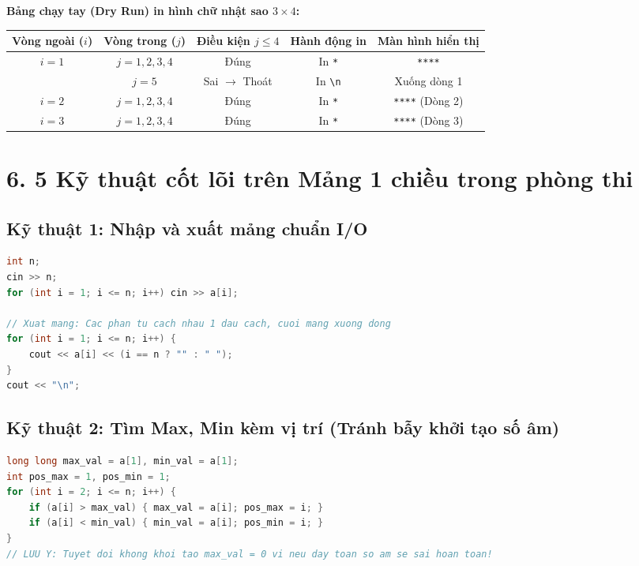 \documentclass[11pt,a4paper]{article}
\begin{document}
\vspace{-0.1cm}
\begin{center}
\footnotesize
\textbf{Bảng chạy tay (Dry Run) in hình chữ nhật sao $3 \times 4$:}
\vspace{0.1cm}

\begin{tabular}{ccccc}
\toprule
\textbf{Vòng ngoài ($i$)} & \textbf{Vòng trong ($j$)} & \textbf{Điều kiện $j \le 4$} & \textbf{Hành động in} & \textbf{Màn hình hiển thị} \\
\midrule
$i = 1$ & $j = 1, 2, 3, 4$ & Đúng & In \texttt{*} & \texttt{****} \\
        & $j = 5$          & Sai $\rightarrow$ Thoát & In \texttt{\textbackslash n} & Xuống dòng 1 \\
$i = 2$ & $j = 1, 2, 3, 4$ & Đúng & In \texttt{*} & \texttt{****} (Dòng 2) \\
$i = 3$ & $j = 1, 2, 3, 4$ & Đúng & In \texttt{*} & \texttt{****} (Dòng 3) \\
\bottomrule
\end{tabular}
\end{center}

\newpage
\section*{\color{AsianDarkBlue}\normalsize 6. 5 Kỹ thuật cốt lõi trên Mảng 1 chiều trong phòng thi}

\subsection*{\color{AsianBlue}\small Kỹ thuật 1: Nhập và xuất mảng chuẩn I/O}
\begin{lstlisting}[language=C++]
int n;
cin >> n;
for (int i = 1; i <= n; i++) cin >> a[i];

// Xuat mang: Cac phan tu cach nhau 1 dau cach, cuoi mang xuong dong
for (int i = 1; i <= n; i++) {
    cout << a[i] << (i == n ? "" : " ");
}
cout << "\n";
\end{lstlisting}

\subsection*{\color{AsianBlue}\small Kỹ thuật 2: Tìm Max, Min kèm vị trí (Tránh bẫy khởi tạo số âm)}
\begin{lstlisting}[language=C++]
long long max_val = a[1], min_val = a[1];
int pos_max = 1, pos_min = 1;
for (int i = 2; i <= n; i++) {
    if (a[i] > max_val) { max_val = a[i]; pos_max = i; }
    if (a[i] < min_val) { min_val = a[i]; pos_min = i; }
}
// LUU Y: Tuyet doi khong khoi tao max_val = 0 vi neu day toan so am se sai hoan toan!
\end{lstlisting}
\end{document}
